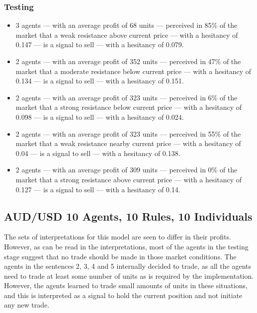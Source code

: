 \subsubsection{Testing}
\label{}

{\small
  \begin{itemize}
  \item 3 agents — with an average profit of 68 units — perceived in 85\% of the
    market that a weak resistance above current price — with a hesitancy of
    0.147 — is a signal to sell — with a hesitancy of 0.079.
  \item 2 agents — with an average profit of 352 units — perceived in 47\% of
    the market that a moderate resistance below current price — with a hesitancy
    of 0.134 — is a signal to sell — with a hesitancy of 0.151.
  \item 2 agents — with an average profit of 323 units — perceived in 6\% of the
    market that a strong resistance below current price — with a hesitancy of
    0.098 — is a signal to sell — with a hesitancy of 0.024.
  \item 2 agents — with an average profit of 323 units — perceived in 55\% of
    the market that a weak resistance nearby current price — with a hesitancy of
    0.04 — is a signal to sell — with a hesitancy of 0.138.
  \item 2 agents — with an average profit of 309 units — perceived in 0\% of the
    market that a strong resistance above current price — with a hesitancy of
    0.127 — is a signal to sell — with a hesitancy of 0.14.
  \end{itemize}
}

\subsection{AUD/USD 10 Agents, 10 Rules, 10 Individuals}
\label{results:interpretation-aud-usd-10agents-10rules-10individuals}

The sets of interpretations for this model are seen to differ in their profits. However, as can be read in the interpretations, most of the agents in the testing stage suggest that no trade should be made in those market conditions. The agents in the sentences 2, 3, 4 and 5 internally decided to trade, as all the agents need to trade at least some number of units as is required by the implementation. However, the agents learned to trade small amounts of units in these situations, and this is interpreted as a signal to hold the current position and not initiate any new trade.


